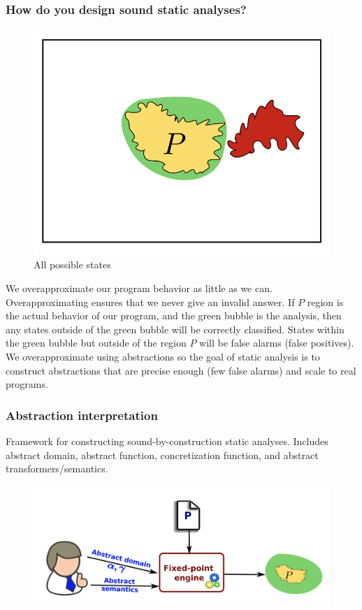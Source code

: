 \documentclass[12pt]{article}
\theoremstyle{remark}
\theoremstyle{remark}
\begin{document}
\subsubsection{How do you design sound static analyses?}
\begin{figure}[h]
    \centering
    \includegraphics[scale=0.5]{overapprox}
    \caption{All possible states}
\end{figure}
We overapproximate our program behavior as little as we can. Overapproximating ensures that we never give an invalid answer. If $P$ region is the actual behavior of our program, and the green bubble is the analysis, then any states outside of the green bubble will be correctly classified. States within the green bubble but outside of the region $P$ will be false alarms (false positives). We overapproximate using abstractions so the goal of static analysis is to construct abstractions that are precise enough (few false alarms) and scale to real programs.


\subsubsection{Abstraction interpretation}
Framework for constructing sound-by-construction static analyses. Includes abstract domain, abstract function, concretization function, and abstract transformers/semantics.
\begin{figure}[h]
    \centering
    \includegraphics[scale=0.3]{analysis-process}
\end{figure}
\end{document}

